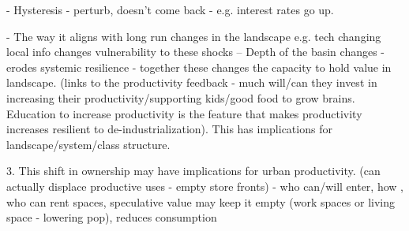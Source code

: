 - Hysteresis - perturb, doesn't come back - e.g. interest rates go up.

- The way it aligns with long run changes in the landscape e.g. tech changing local info changes vulnerability to these shocks -- Depth of the basin changes - erodes systemic resilience - together these changes the capacity to hold value in landscape. (links to the productivity feedback - much will/can they invest in increasing their productivity/supporting kids/good food to grow brains. Education to increase productivity is the feature that makes productivity increases resilient to de-industrialization). This has implications for landscape/system/class structure.

3. This shift in ownership may have implications for urban productivity. (can actually displace productive uses - empty store fronts) - who can/will enter, how , who can rent spaces, speculative value may keep it empty (work spaces or living space - lowering pop), reduces consumption




